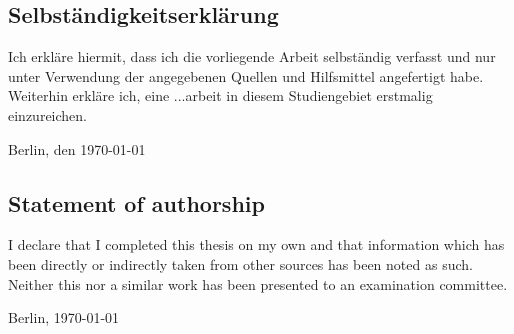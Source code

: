 \thispagestyle{empty}


{\parindent 0cm
  
  \subsection*{Selbst\"andigkeitserkl\"arung}
  Ich erkl\"are hiermit, dass ich die vorliegende Arbeit selbst\"andig verfasst 
  und nur unter Verwendung der angegebenen Quellen und Hilfsmittel angefertigt habe. 
  Weiterhin erkl\"are ich, eine ...arbeit in diesem Studiengebiet erstmalig einzureichen.\\
  \vspace{3\baselineskip}
  
  Berlin, den \today \hspace{0.25\linewidth}\parbox{0.3\linewidth}{\dotfill}

\subsection*{Statement of authorship}
I declare that I completed this thesis on my own and that information which has been 
directly or indirectly taken from other sources has been noted as such. Neither this 
nor a similar work has been presented to an examination committee.

  \vspace{3\baselineskip}
  
  Berlin, \today \hspace{0.25\linewidth}\parbox{0.3\linewidth}{\dotfill}
}


